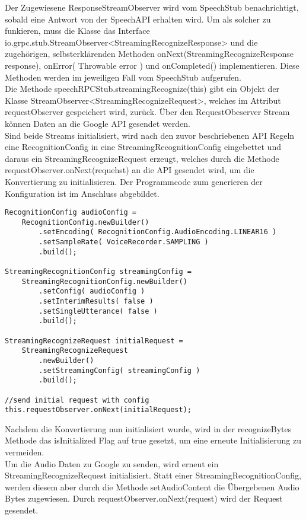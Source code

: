 Der Zugewiesene ResponseStreamObserver wird vom SpeechStub benachrichtigt, sobald eine Antwort von der SpeechAPI erhalten wird. Um als solcher zu funkieren, muss die Klasse das Interface io.grpc.stub.StreamObserver<StreamingRecognizeResponse> und die zugehörigen, selbsterklärenden Methoden onNext(StreamingRecognizeResponse response), onError( Throwable error ) und onCompleted() implementieren. Diese Methoden werden im jeweiligen Fall vom SpeechStub aufgerufen.\\
Die Methode speechRPCStub.streamingRecognize(this) gibt ein Objekt der Klasse StreamObserver<StreamingRecognizeRequest>, welches im Attribut requestObserver gespeichert wird, zurück. Über den RequestObeserver Stream können Daten an die Google API gesendet werden.\\
Sind beide Streams initialisiert, wird nach den zuvor beschriebenen API Regeln eine RecognitionConfig in eine StreamingRecognitionConfig eingebettet und daraus ein StreamingRecognizeRequest erzeugt, welches durch die Methode requestObserver.onNext(requehst) an die API gesendet wird, um die Konvertierung zu initialisieren. Der Programmcode zum generieren der Konfiguration ist im Anschluss abgebildet.
\begin{lstlisting}
RecognitionConfig audioConfig =
	RecognitionConfig.newBuilder()
		.setEncoding( RecognitionConfig.AudioEncoding.LINEAR16 )
		.setSampleRate( VoiceRecorder.SAMPLING )
		.build();

StreamingRecognitionConfig streamingConfig =
	StreamingRecognitionConfig.newBuilder()
		.setConfig( audioConfig )
		.setInterimResults( false )
		.setSingleUtterance( false )
		.build();

StreamingRecognizeRequest initialRequest =
	StreamingRecognizeRequest
		.newBuilder()
		.setStreamingConfig( streamingConfig )
		.build();
		
//send initial request with config
this.requestObserver.onNext(initialRequest);

\end{lstlisting}
Nachdem die Konvertierung nun initialisiert wurde, wird in der recognizeBytes Methode das isInitialized Flag auf true gesetzt, um eine erneute Initialisierung zu vermeiden.\\
Um die Audio Daten zu Google zu senden, wird erneut ein StreamingRecognizeRequest initialisiert. Statt einer StreamingRecognitionConfig, werden diesem aber durch die Methode setAudioContent die Übergebenen Audio Bytes zugewiesen. Durch requestObserver.onNext(request) wird der Request gesendet.


